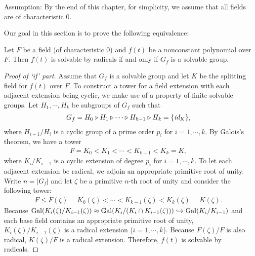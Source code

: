 \begin{center}
    Assumption: By the end of this chapter, for simplicity, we assume that all fields are of characteristic 0.
\end{center}
Our goal in this section is to prove the following equivalence:
\begin{thm}
    Let $F$ be a field (of characteristic 0) and $f(t)$ be a nonconstant polynomial over $F$.
    Then $f(t)$ is solvable by radicals if and only if $G_f$ is a solvable group.
\end{thm}
\begin{proof}[Proof of `if' part]
    Assume that $G_f$ is a solvable group and let $K$ be the splitting field for $f(t)$ over $F$.
    \color{teal}To construct a tower for a field extension with each adjacent extension being cyclic, we make use of a property of finite solvable groups\color{black}.
    Let $H_1, \cdots, H_k$ be subgroups of $G_f$ such that
    \begin{align*}
        G_f=H_0\triangleright H_1\triangleright \cdots\triangleright H_{k-1}\triangleright H_k=\{\textit{id}_{K}\},
    \end{align*}
    where $H_{i-1}/H_i$ is a cyclic group of a prime order $p_i$ for $i=1, \cdots, k$.
    By Galois's theorem, we have a tower
    \begin{align*}
        F=K_0<K_1<\cdots<K_{k-1}<K_k=K,
    \end{align*}
    where $K_i/K_{i-1}$ is a cyclic extension of degree $p_i$ for $i=1, \cdots, k$.
    \color{teal}To let each adjacent extension be radical, we adjoin an appropriate primitive root of unity\color{black}.
    Write $n=|G_f|$ and let $\zeta$ be a primitive $n$-th root of unity and consider the following tower:
    \begin{align*}
        F\leq F(\zeta) = K_0(\zeta) < \cdots < K_{k-1}(\zeta) < K_k(\zeta)=K(\zeta).
    \end{align*}
    Because ${\textrm{Gal}({K_i(\zeta)/K_{i-1}(\zeta)})}\approx {\textrm{Gal}({K_i/(K_i\cap K_{i-1}(\zeta))})}\hookrightarrow {\textrm{Gal}({K_i/K_{i-1}})}$ and each base field contains an appropriate primitive root of unity, $K_i(\zeta)/K_{i-1}(\zeta)$ is a radical extension ($i=1, \cdots, k$).
    Because $F(\zeta)/F$ is also radical, $K(\zeta)/F$ is a radical extension.
    Therefore, $f(t)$ is solvable by radicals.
\end{proof}
